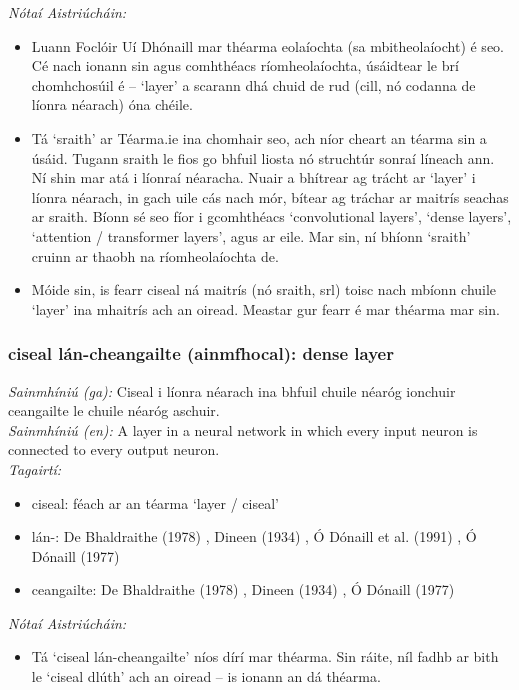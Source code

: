  \noindent \textit{Nótaí Aistriúcháin:}
\begin{itemize}
	\item Luann Foclóir Uí Dhónaill mar théarma eolaíochta (sa mbitheolaíocht) é seo. Cé nach ionann sin agus comhthéacs ríomheolaíochta, úsáidtear le brí chomhchosúil é -- `layer' a scarann dhá chuid de rud (cill, nó codanna de líonra néarach) óna chéile.
	\item Tá `sraith' ar Téarma.ie ina chomhair seo, ach níor cheart an téarma sin a úsáid. Tugann sraith le fios go bhfuil liosta nó struchtúr sonraí líneach ann. Ní shin mar atá i líonraí néaracha. Nuair a bhítrear ag trácht ar `layer' i líonra néarach, in gach uile cás nach mór, bítear ag tráchar ar maitrís seachas ar sraith. Bíonn sé seo fíor i gcomhthéacs `convolutional layers', `dense layers', `attention / transformer layers', agus ar eile. Mar sin, ní bhíonn `sraith' cruinn ar thaobh na ríomheolaíochta de.
	\item Móide sin, is fearr ciseal ná maitrís (nó sraith, srl) toisc nach mbíonn chuile `layer' ina mhaitrís ach an oiread. Meastar gur fearr é mar théarma mar sin.
\end{itemize}


\subsubsection*{ciseal lán-cheangailte (ainmfhocal): dense layer}
 \noindent \textit{Sainmhíniú (ga):} Ciseal i líonra néarach ina bhfuil chuile néaróg ionchuir ceangailte le chuile néaróg aschuir.
\\
 \noindent \textit{Sainmhíniú (en):} A layer in a neural network in which every input neuron is connected to every output neuron.
\\
 \noindent \textit{Tagairtí:}
\begin{itemize}
	\item ciseal: féach ar an téarma `layer / ciseal'
	\item lán-: De Bhaldraithe (1978) \cite{de-bhaldraithe}, Dineen (1934) \cite{dineen}, Ó Dónaill et al. (1991) \cite{focloir-beag}, Ó Dónaill (1977) \cite{odonaill}
	\item ceangailte: De Bhaldraithe (1978) \cite{de-bhaldraithe}, Dineen (1934) \cite{dineen}, Ó Dónaill (1977) \cite{odonaill}
\end{itemize}

 \noindent \textit{Nótaí Aistriúcháin:}
\begin{itemize}
	\item Tá `ciseal lán-cheangailte' níos dírí mar théarma. Sin ráite, níl fadhb ar bith le `ciseal dlúth' ach an oiread -- is ionann an dá théarma.
\end{itemize}


